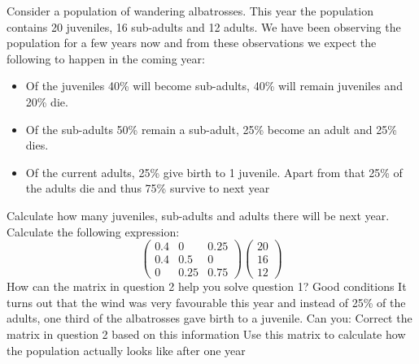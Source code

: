 \documentclass[a4paper]{report}
\begin{document}
\begin{Exercise}[label=alba,title=Population ecology and matrices, difficulty=1]
Consider a population of wandering albatrosses. This year the population contains 20 juveniles, 16 sub-adults and 12 adults. We have been observing the population for a few years now and from these observations we expect the following to happen in the coming year:
\begin{itemize}
\item Of the juveniles 40\% will become sub-adults, 40\% will remain juveniles and 20\% die.
\item Of the sub-adults 50\% remain a sub-adult, 25\% become an adult and 25\% dies.
\item Of the current adults, 25\% give birth to 1 juvenile. Apart from that 25\% of the adults die and thus 75\% survive to next year
\end{itemize}
\Question Calculate how many juveniles, sub-adults and adults there will be next year.
\Question Calculate the following expression:
\begin{equation*}
\begin{pmatrix}0.4&0&0.25\\0.4&0.5&0\\0&0.25&0.75\end{pmatrix}\begin{pmatrix}20\\16\\12\end{pmatrix}
\end{equation*}
\Question How can the matrix in question 2 help you solve question 1?
\Question Good conditions
It turns out that the wind was very favourable this year and instead of
25\% of the adults, one third of the albatrosses gave birth to a juvenile.
Can you:
\subQuestion Correct the matrix in question 2 based on this information
\subQuestion Use this matrix to calculate how the population actually looks like after one year
\end{Exercise}
\end{document}
